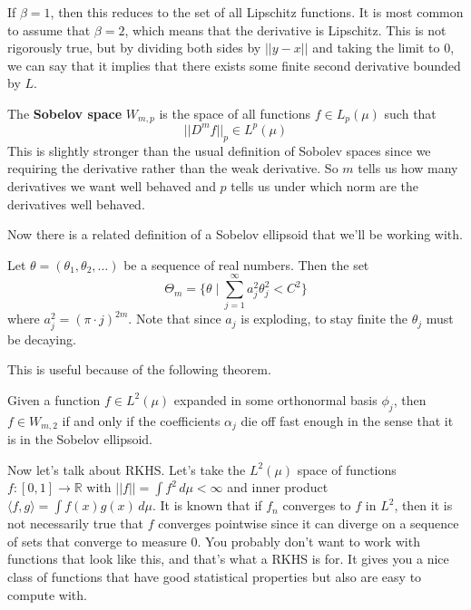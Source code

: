 \documentclass{article}
\begin{document}
  If $\beta = 1$, then this reduces to the set of all Lipschitz functions. It is most common to assume that $\beta = 2$, which means that the derivative is Lipschitz. This is not rigorously true, but by dividing both sides by $||y - x||$ and taking the limit to $0$, we can say that it implies that there exists some finite second derivative bounded by $L$. 

  \begin{definition}
    The \textbf{Sobelov space} $W_{m, p}$ is the space of all functions $f \in L_p (\mu)$ such that 
    \begin{equation}
      ||D^m f||_p \in L^p (\mu)
    \end{equation}
    This is slightly stronger than the usual definition of Sobolev spaces since we requiring the derivative rather than the weak derivative. So $m$ tells us how many derivatives we want well behaved and $p$ tells us under which norm are the derivatives well behaved. 
  \end{definition}

  Now there is a related definition of a Sobelov ellipsoid that we'll be working with. 

  \begin{definition}
    Let $\theta = (\theta_1, \theta_2, \ldots)$ be a sequence of real numbers. Then the set 
    \begin{equation}
      \Theta_m = \bigg\{ \theta \mid \sum_{j=1}^\infty a_j^2 \theta_j^2 < C^2 \bigg\}
    \end{equation}
    where $a_j^2 = (\pi \cdot j)^{2m}$. Note that since $a_j$ is exploding, to stay finite the $\theta_j$ must be decaying.
  \end{definition}

  This is useful because of the following theorem. 
  
  \begin{theorem}
    Given a function $f \in L^2(\mu)$ expanded in some orthonormal basis $\phi_j$, then $f \in W_{m, 2}$ if and only if the coefficients $\alpha_j$ die off fast enough in the sense that it is in the Sobelov ellipsoid. 
  \end{theorem}

  Now let's talk about RKHS. Let's take the $L^2(\mu)$ space of functions $f: [0, 1] \rightarrow \mathbb{R}$ with $||f|| = \int f^2 \,d\mu < \infty$ and inner product $\langle f, g \rangle = \int f(x) g(x) \,d\mu$. It is known that if $f_n$ converges to $f$ in $L^2$, then it is not necessarily true that $f$ converges pointwise since it can diverge on a sequence of sets that converge to measure $0$. You probably don't want to work with functions that look like this, and that's what a RKHS is for. It gives you a nice class of functions that have good statistical properties but also are easy to compute with.  
\end{document}
